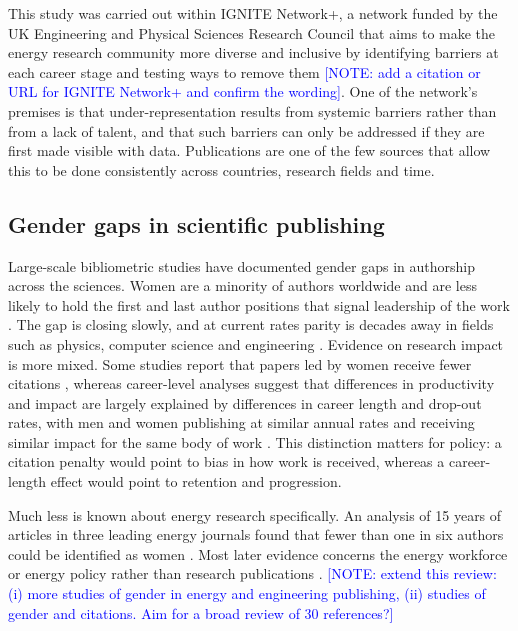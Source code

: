 \documentclass[preprint,12pt,number]{elsarticle}
\newcommand{\note}[1]{\textcolor{blue}{[NOTE: #1]}}
\begin{document}
This study was carried out within IGNITE Network+, a network funded by the UK Engineering and Physical Sciences Research Council that aims to make the energy research community more diverse and inclusive by identifying barriers at each career stage and testing ways to remove them \note{add a citation or URL for IGNITE Network+ and confirm the wording}. One of the network's premises is that under-representation results from systemic barriers rather than from a lack of talent, and that such barriers can only be addressed if they are first made visible with data. Publications are one of the few sources that allow this to be done consistently across countries, research fields and time.

\subsection{Gender gaps in scientific publishing}

Large-scale bibliometric studies have documented gender gaps in authorship across the sciences. Women are a minority of authors worldwide and are less likely to hold the first and last author positions that signal leadership of the work \citep{Lariviere2013,West2013}. The gap is closing slowly, and at current rates parity is decades away in fields such as physics, computer science and engineering \citep{Holman2018}. Evidence on research impact is more mixed. Some studies report that papers led by women receive fewer citations \citep{Lariviere2013}, whereas career-level analyses suggest that differences in productivity and impact are largely explained by differences in career length and drop-out rates, with men and women publishing at similar annual rates and receiving similar impact for the same body of work \citep{Huang2020}. This distinction matters for policy: a citation penalty would point to bias in how work is received, whereas a career-length effect would point to retention and progression.

Much less is known about energy research specifically. An analysis of 15 years of articles in three leading energy journals found that fewer than one in six authors could be identified as women \citep{Sovacool2014}. Most later evidence concerns the energy workforce or energy policy rather than research publications \citep{Pearl-Martinez2016,IRENA2019}. \note{extend this review: (i) more studies of gender in energy and engineering publishing, (ii) studies of gender and citations. Aim for a broad review of 30 references?}
\end{document}

